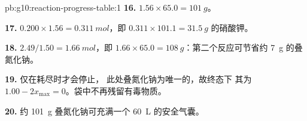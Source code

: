 \begin{solution}{pb:g10:reaction-progress-table:1}
\textbf{16.} $1.56 \times 65.0 = \qty{101}{g}$。

\textbf{17.} $0.200 \times 1.56 = \qty{0.311}{mol}$，即
$0.311 \times 101.1 = \qty{31.5}{g}$ 的硝酸钾。

\textbf{18.} $2.49 / 1.50 = \qty{1.66}{mol}$，即
$1.66 \times 65.0 = \qty{108}{g}$：第二个反应可节省约
\qty{7}{g} 的叠氮化钠。

\textbf{19.} 仅在耗尽时才会停止，
此处叠氮化钠为唯一的，故终态下
其为 $1.00 - 2x_{\max} = 0$。袋中不再残留有毒物质。

\textbf{20.} 约 \qty{101}{g} 叠氮化钠可充满一个 \qty{60}{L}
的安全气囊。
\end{solution}
